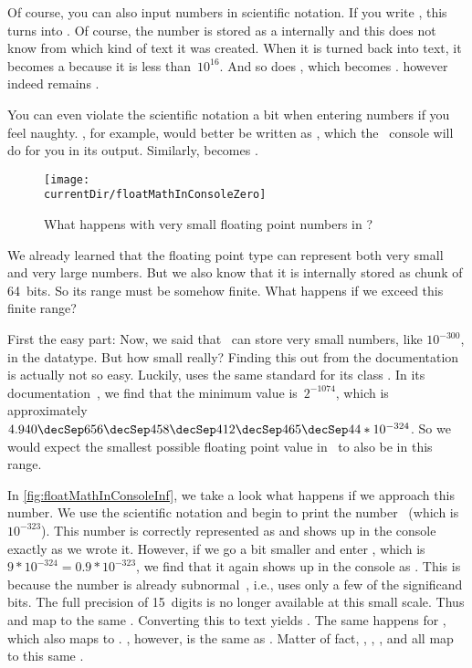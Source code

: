 Of course, you can also input numbers in scientific notation.
If you write , this turns into .
Of course, the number is stored as a  internally and this  does not know from which kind of text it was created.
When it is turned back into text, it becomes a  because it is less than~$10^{16}$.
And so does , which becomes .
 however indeed remains .

You can even violate the scientific notation a bit when entering numbers if you feel naughty.
, for example, would better be written as , which the \python\ console will do for you in its output.
Similarly,  becomes .
\endhsection%
%
%
%
\begin{figure}%
\centering%
\texttt{[image: \\currentDir/floatMathInConsoleZero]}%
\caption{What happens with very small floating point numbers in \python?}%
\label{fig:floatMathInConsoleZero}%
\end{figure}%
%
We already learned that the floating point type  can represent both very small and very large numbers.
But we also know that it is internally stored as chunk of 64~bits.
So its range must be somehow finite.
What happens if we exceed this finite range?

First the easy part:
Now, we said that \python\ can store very small numbers, like $10^{-300}$, in the  datatype.
But how small really?
Finding this out from the documentation is actually not so easy.
Luckily,  uses the same standard for its class .
In its documentation~\cite{O2024CD}, we find that the minimum value is~$2^{-1074}$, which is approximately~$4.940\decSep656\decSep458\decSep412\decSep465\decSep44*10^{-324}$.
So we would expect the smallest possible floating point value in \python\ to also be in this range.

In \cref{fig:floatMathInConsoleInf}, we take a look what happens if we approach this number.
We use the scientific notation and begin to print the number~ (which is~$10^{-323}$).
This number is correctly represented as  and shows up in the console exactly as we wrote it.
However, if we go a bit smaller and enter , which is~$9*10^{-324}=0.9*10^{-323}$, we find that it again shows up in the console as .
This is because the number is already subnormal~\cite{IEEE2019ISFFPA,H1997IS7FPN}, i.e., uses only a few of the significand bits.
The full precision of 15~digits is no longer available at this small scale.
Thus  and  map to the same .
Converting this  to text yields .
The same happens for , which also maps to .
, however, is the same as .
Matter of fact, , , , and  all map to this same .

